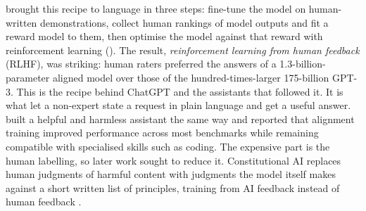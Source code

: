 \citet{ouyang2022instructgpt} brought this recipe to language in three steps:
fine-tune the model on human-written demonstrations, collect human rankings of model
outputs and fit a reward model to them, then optimise the model against that reward
with reinforcement learning (). The result, \emph{reinforcement learning from human
feedback} (RLHF), was striking: human raters preferred the answers of a
1.3-billion-parameter aligned model over those of the hundred-times-larger 175-billion
GPT-3. This is the recipe behind ChatGPT and the assistants that followed it. It is what
let a non-expert state a request in plain language and get a useful answer.
\citet{bai2022hh} built a helpful and harmless assistant the same way and reported that
alignment training improved performance across most benchmarks while remaining
compatible with specialised skills such as coding. The expensive part is the human
labelling, so later work sought to reduce it. Constitutional AI replaces human judgments
of harmful content with judgments the model itself makes against a short written list of
principles, training from AI feedback instead of human feedback
\citep{bai2022constitutional}.

